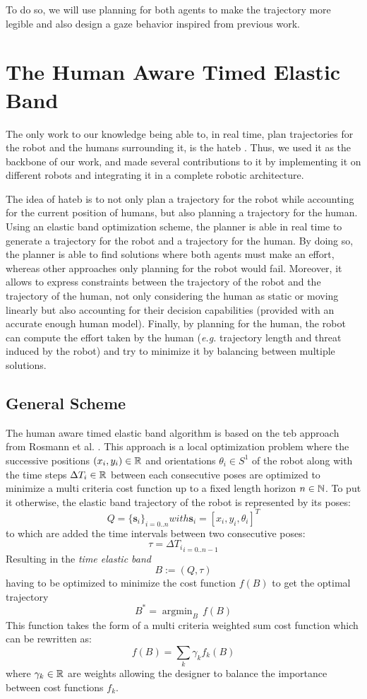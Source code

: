 \documentclass[a4paper,11pt,twoside]{StyleThese}
\begin{document}
To do so, we will use planning for both agents to make the trajectory more legible and also design a gaze behavior inspired from previous work.



\section{The Human Aware Timed Elastic Band}
The only work to our knowledge being able to, in real time, plan trajectories for the robot and the humans surrounding it, is the \acrfull{hateb} \cite{khambhaita_viewing_2017}. Thus, we used it as the backbone of our work, and made several contributions to it by implementing it on different robots and integrating it in a complete robotic architecture.

The idea of \acrshort{hateb} is to not only plan a trajectory for the robot while accounting for the current position of humans, but also planning a trajectory for the human. Using an elastic band optimization scheme, the planner is able in real time to generate a trajectory for the robot and a trajectory for the human. By doing so, the planner is able to find solutions where both agents must make an effort, whereas other approaches only planning for the robot would fail. Moreover, it allows to express constraints between the trajectory of the robot and the trajectory of the human, not only considering the human as static or moving linearly but also accounting for their decision capabilities (provided with an accurate enough human model). Finally, by planning for the human, the robot can compute the effort taken by the human (\textit{e.g.} trajectory length and threat induced by the robot) and try to minimize it by balancing between multiple solutions.

\subsection{General Scheme}
The human aware timed elastic band algorithm is based on the \acrfull{teb} approach from Rosmann et al. \cite{rosmann_efficient_2013}. This approach is a local optimization problem where the successive positions $(x_i, y_i) \in \mathbb{R}$ and orientations $\theta_i \in S^1$ of the robot along with the time steps $\Delta T_i \in \mathbb{R}$ between each consecutive poses are optimized to minimize a multi criteria cost function up to a fixed length horizon $n \in \mathbb{N}$. To put it otherwise, the elastic band trajectory of the robot is represented by its poses: 
\[Q = \{\textbf{s}_i\}_{i=0..n} with \textbf{s}_i = [x_i, y_i, \theta_i]^T\] to which are added the time intervals between two consecutive poses: \[\tau = {\Delta T_i}_{i=0..n-1}\] Resulting in the \textit{time elastic band} \[B := (Q, \tau)\] having to be optimized to minimize the cost function $f(B)$ to get the optimal trajectory \[B^* = \mathop{\mathrm{argmin}}_B\,f(B)\]
This function takes the form of a multi criteria weighted sum cost function which can be rewritten as: \[ f(B) = \sum_{k} \gamma_k f_k(B) \] where $\gamma_k \in \mathbb{R}$ are weights allowing the designer to balance the importance between cost functions $f_k$.
\end{document}
